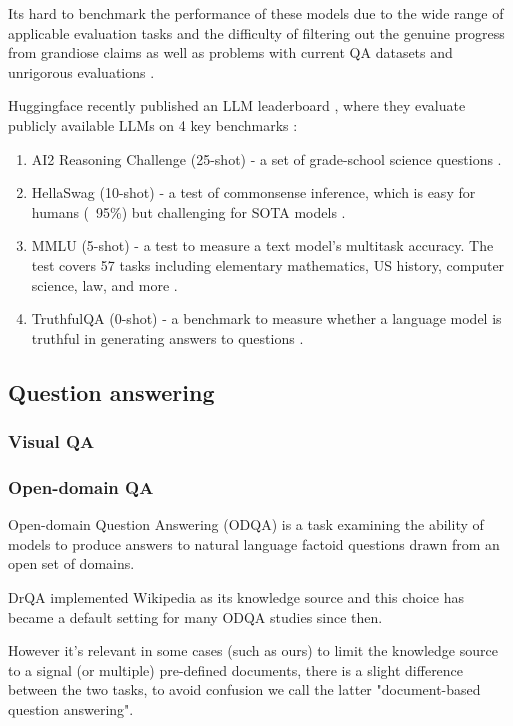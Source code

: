 \documentclass[a4paper,12pt]{article}
\begin{document}
Its hard to benchmark the performance of these models due to the wide range of applicable evaluation tasks and the difficulty of filtering out the genuine progress from grandiose claims as well as problems with current QA datasets and unrigorous evaluations \cite{unfairdataset}.

Huggingface recently published an LLM leaderboard \cite{open-llm-leaderboard}, where they evaluate publicly available LLMs on 4 key benchmarks : 

\begin{enumerate}
    \item AI2 Reasoning Challenge (25-shot) - a set of grade-school science questions \cite{AI2}.
    \item HellaSwag (10-shot) - a test of commonsense inference, which is easy for humans (~95\%) but challenging for SOTA models \cite{hellaswag}. 
    \item MMLU (5-shot) - a test to measure a text model’s multitask accuracy. The test covers 57 tasks including elementary mathematics, US history, computer science, law, and more \cite{MMLU}.
    \item TruthfulQA (0-shot) - a benchmark to measure whether a language model is truthful in generating answers to questions \cite{truthfulqa}.
\end{enumerate}

\subsection{Question answering}
\subsubsection{Visual QA}
\subsubsection{Open-domain QA}
Open-domain Question Answering (ODQA) is a
task examining the ability of models to produce answers to natural language factoid questions drawn
from an open set of domains.

DrQA \cite{drqa} implemented Wikipedia as its knowledge source and this choice has became a default setting for many ODQA studies since then.

However it's relevant in some cases (such as ours) to limit the knowledge source to a signal (or multiple) pre-defined documents, there is a slight difference between the two tasks, to avoid confusion we call the latter "document-based question answering". 
\end{document}
